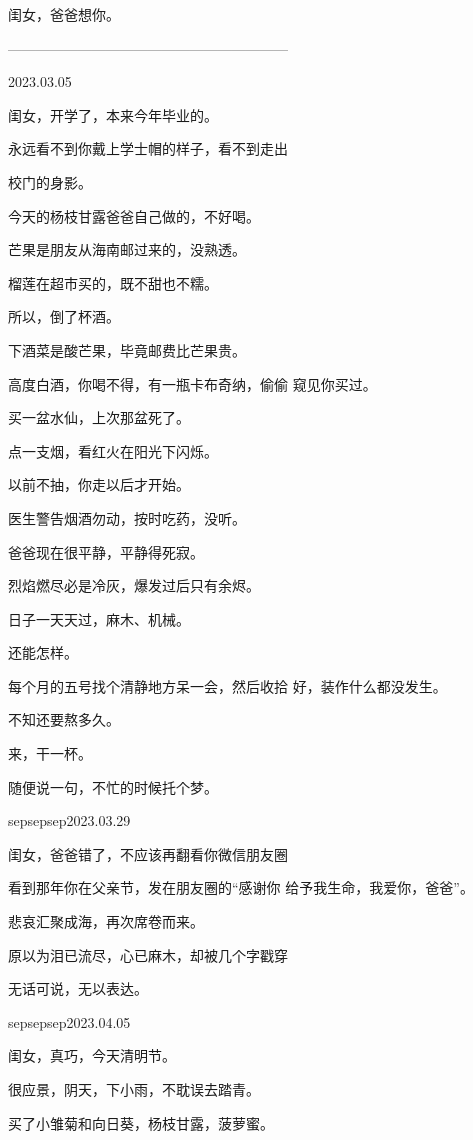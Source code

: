 \documentclass{article}
\begin{document}
闺女，爸爸想你。 

————————————————————


2023.03.05 


闺女，开学了，本来今年毕业的。 

永远看不到你戴上学士帽的样子，看不到走出
\newpage

校门的身影。 


今天的杨枝甘露爸爸自己做的，不好喝。 


芒果是朋友从海南邮过来的，没熟透。 


榴莲在超市买的，既不甜也不糯。 


所以，倒了杯酒。 


下酒菜是酸芒果，毕竟邮费比芒果贵。 

高度白酒，你喝不得，有一瓶卡布奇纳，偷偷
窥见你买过。 


买一盆水仙，上次那盆死了。 


点一支烟，看红火在阳光下闪烁。 


以前不抽，你走以后才开始。 

\newpage


医生警告烟酒勿动，按时吃药，没听。 


爸爸现在很平静，平静得死寂。 


烈焰燃尽必是冷灰，爆发过后只有余烬。 


日子一天天过，麻木、机械。 


还能怎样。 

每个月的五号找个清静地方呆一会，然后收拾
好，装作什么都没发生。 


不知还要熬多久。 


来，干一杯。 


随便说一句，不忙的时候托个梦。 



\newpage

sepsepsep2023.03.29 

闺女，爸爸错了，不应该再翻看你微信朋友圈

看到那年你在父亲节，发在朋友圈的“感谢你
给予我生命，我爱你，爸爸”。 


悲哀汇聚成海，再次席卷而来。 

原以为泪已流尽，心已麻木，却被几个字戳穿


无话可说，无以表达。 


sepsepsep2023.04.05 


闺女，真巧，今天清明节。 


很应景，阴天，下小雨，不耽误去踏青。 


买了小雏菊和向日葵，杨枝甘露，菠萝蜜。 
\end{document}
